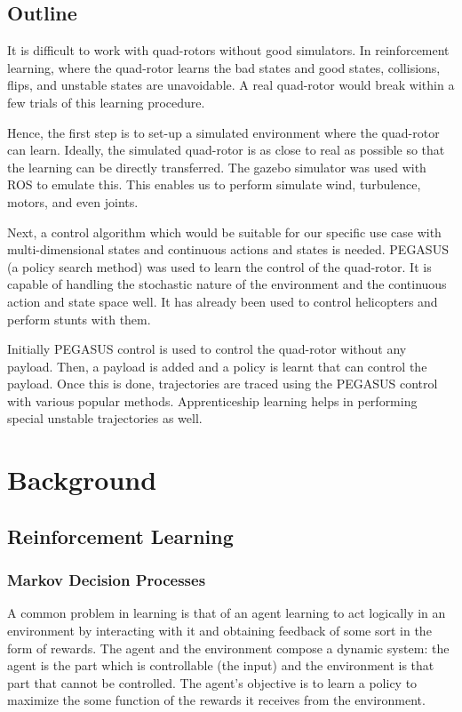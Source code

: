 \documentclass[hidelinks,BTech]{iitmdiss}
\begin{document}
\section{Outline}

It is difficult to work with quad-rotors without good simulators. In reinforcement learning, where the quad-rotor learns the bad states and good states, collisions, flips, and unstable states are unavoidable. A real quad-rotor would break within a few trials of this learning procedure.

Hence, the first step is to set-up a simulated environment where the quad-rotor can learn. Ideally, the simulated quad-rotor is as close to real as possible so that the learning can be directly transferred. The gazebo simulator was used with ROS to emulate this. This enables us to perform simulate wind, turbulence, motors, and even joints.

Next, a control algorithm which would be suitable for our specific use case with multi-dimensional states and continuous actions and states is needed. PEGASUS (a policy search method) was used to learn the control of the quad-rotor. It is capable of handling the stochastic nature of the environment and the continuous action and state space well. It has already been used to control helicopters and perform stunts with them.

Initially PEGASUS control is used to control the quad-rotor without any payload. Then, a payload is added and a policy is learnt that can control the payload. Once this is done, trajectories are traced using the PEGASUS control with various popular methods. Apprenticeship learning helps in performing special unstable trajectories as well.

\chapter{Background}

\section{Reinforcement Learning}

\subsection{Markov Decision Processes}
A common problem in learning is that of an agent learning to act logically in an environment by interacting with it and obtaining feedback of some sort in the form of rewards. The agent and the environment compose a dynamic system: the agent is the part which is controllable (the input) and the environment is that part that cannot be controlled. The agent's objective is to learn a policy to maximize the some function of the rewards it receives from the environment.
\end{document}
